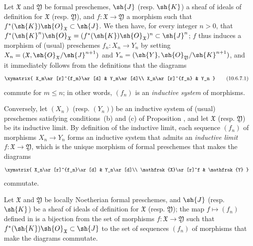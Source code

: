 \begin{env}[10.6.7]
\label{I.10.6.7}
Let $\mathfrak{X}$ and $\mathfrak{Y}$ be formal preschemes, $\sh{J}$ (resp. $\sh{K}$) a sheaf of ideals of definition for $\mathfrak{X}$ (resp. $\mathfrak{Y}$), and $f:\mathfrak{X}\to\mathfrak{Y}$ a morphism such that $f^*(\sh{K})\sh{O}_\mathfrak{X}\subset\sh{J}$.
We then have, for every integer $n>0$, that $f^*(\sh{K}^n)\sh{O}_\mathfrak{X}=(f^*(\sh{K})\sh{O}_\mathfrak{X})^n\subset\sh{J}^n$; $f$ thus induces  a morphism of (usual) preschemes $f_n:X_n\to Y_n$ by setting $X_n=(\mathfrak{X},\sh{O}_\mathfrak{X}/\sh{J}^{n+1})$ and $Y_n=(\sh{Y},\sh{O}_\mathfrak{Y}/\sh{K}^{n+1})$, and it immediately follows from the definitions that the diagrams
\[
\label{I.10.6.7.1}
  \xymatrix{
    X_m\ar[r]^{f_m}\ar[d] &
    Y_m\ar[d]\\
    X_n\ar[r]^{f_n} &
    Y_n
  }
  \tag{10.6.7.1}
\]
commute for $m\leq n$; in other words, $(f_n)$ is an \emph{inductive system} of morphisms.
\end{env}

\begin{env}[10.6.8]
\label{I.10.6.8}
Conversely, let $(X_n)$ (resp. $(Y_n)$) be an inductive system of (usual) preschemes satisfying conditions~(b) and (c) of Proposition , and let $\mathfrak{X}$ (resp. $\mathfrak{Y}$) be its inductive limit.
By definition of the inductive limit, each sequence $(f_n)$ of morphisms $X_n\to Y_n$ forms an inductive system that admits an \emph{inductive limit $f:\mathfrak{X}\to\mathfrak{Y}$}, which is the unique morphism of formal preschemes that makes the diagrams
\[
  \xymatrix{
    X_n\ar[r]^{f_n}\ar[d] &
    Y_n\ar[d]\\
    \mathfrak{X}\ar[r]^f &
    \mathfrak{Y}
  }
\]
commutate.
\end{env}

\begin{proposition}[10.6.9]
\label{I.10.6.9}
Let $\mathfrak{X}$ and $\mathfrak{Y}$ be locally Noetherian formal preschemes, and $\sh{J}$ (resp. $\sh{K}$) be a sheaf of ideals of definition for $\mathfrak{X}$ (resp. $\mathfrak{Y}$); the map $f\mapsto(f_n)$ defined in  is a bijection from the set of morphisms $f:\mathfrak{X}\to\mathfrak{Y}$ such that $f^*(\sh{K})\sh{O}_\mathfrak{X}\subset\sh{J}$ to the set of sequences $(f_n)$ of morphisms that make the diagrams  commutate.
\end{proposition}

